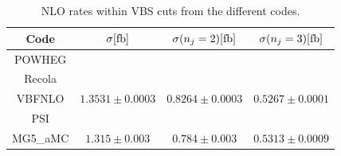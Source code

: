 \documentclass[a4paper,10pt]{report}
\begin{document}
\begin{table}[h!]
    \begin{tabular}{c|c|c|c}
        Code  &  $\sigma[\rm{fb}]$  &  $\sigma(n_j=2)[\rm{fb}]$  &  $\sigma(n_j=3)[\rm{fb}]$\\
        \hline
        \hline
        {\sc POWHEG}  &  \\
        {\sc Recola}  &  \\
        {\sc VBFNLO}  &  $1.3531 \pm 0.0003$  &  $0.8264 \pm  0.0003$  &  $0.5267 \pm 0.0001$\\
        {\sc PSI}     &  \\
        {\sc MG5\_aMC}&  $1.315 \pm 0.003$  &  $0.784 \pm  0.003$  &  $0.5313 \pm 0.0009$\\
    \end{tabular}
    \caption{\label{tab:NLOrates} NLO rates within VBS cuts from the different codes.}
\end{table}
\end{document}

